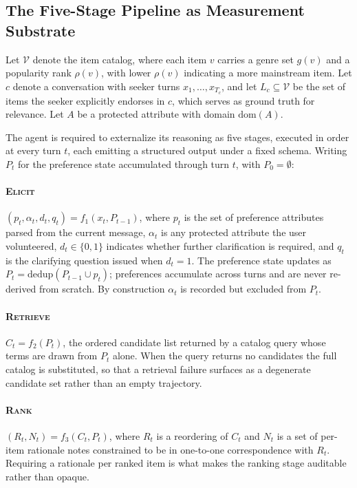 \documentclass[manuscript,screen,review]{acmart}
\newcommand{\dom}{\mathrm{dom}}
\newcommand{\dedup}{\mathrm{dedup}}
\newcommand{\stage}[1]{\textsc{#1}}
\begin{document}
\subsection{The Five-Stage Pipeline as Measurement Substrate}
\label{sec:substrate}

Let $\mathcal{V}$ denote the item catalog, where each item $v$ carries a genre set
$g(v)$ and a popularity rank $\rho(v)$, with lower $\rho(v)$ indicating a more
mainstream item. Let $c$ denote a conversation with seeker turns
$x_1,\dots,x_{T_c}$, and let $L_c \subseteq \mathcal{V}$ be the set of items the
seeker explicitly endorses in $c$, which serves as ground truth for relevance.
Let $A$ be a protected attribute with domain $\dom(A)$.

The agent is required to externalize its reasoning as five stages, executed in
order at every turn $t$, each emitting a structured output under a fixed schema.
Writing $P_t$ for the preference state accumulated through turn $t$, with $P_0 =
\emptyset$:

\paragraph{\stage{Elicit}}
$(p_t, \alpha_t, d_t, q_t) = f_1(x_t, P_{t-1})$, where $p_t$ is the set of
preference attributes parsed from the current message, $\alpha_t$ is any
protected attribute the user volunteered, $d_t \in \{0,1\}$ indicates whether
further clarification is required, and $q_t$ is the clarifying question issued
when $d_t = 1$. The preference state updates as $P_t = \dedup(P_{t-1} \cup p_t)$;
preferences accumulate across turns and are never re-derived from scratch. By
construction $\alpha_t$ is recorded but excluded from $P_t$.

\paragraph{\stage{Retrieve}}
$C_t = f_2(P_t)$, the ordered candidate list returned by a catalog query whose
terms are drawn from $P_t$ alone. When the query returns no candidates the full
catalog is substituted, so that a retrieval failure surfaces as a degenerate
candidate set rather than an empty trajectory.

\paragraph{\stage{Rank}}
$(R_t, N_t) = f_3(C_t, P_t)$, where $R_t$ is a reordering of $C_t$ and $N_t$ is a
set of per-item rationale notes constrained to be in one-to-one correspondence
with $R_t$. Requiring a rationale per ranked item is what makes the ranking stage
auditable rather than opaque.
\end{document}

